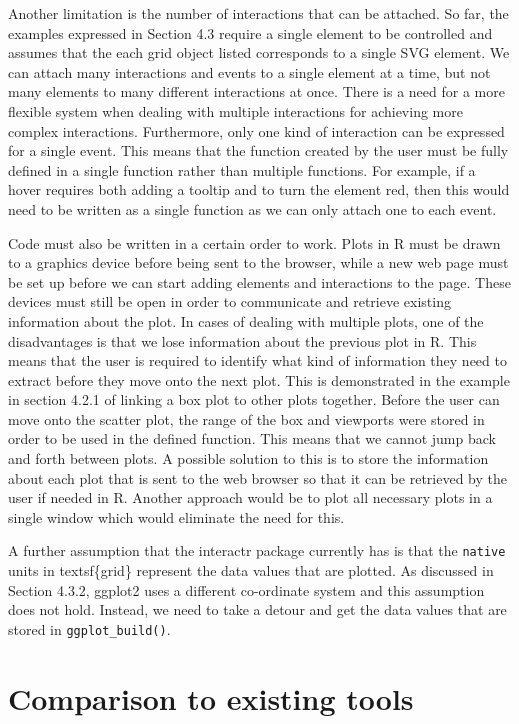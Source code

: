 \documentclass[11pt,]{report}
\begin{document}
Another limitation is the number of interactions that can be attached.
So far, the examples expressed in Section 4.3 require a single element
to be controlled and assumes that the each grid object listed
corresponds to a single SVG element. We can attach many interactions and
events to a single element at a time, but not many elements to many
different interactions at once. There is a need for a more flexible
system when dealing with multiple interactions for achieving more
complex interactions. Furthermore, only one kind of interaction can be
expressed for a single event. This means that the function created by
the user must be fully defined in a single function rather than multiple
functions. For example, if a hover requires both adding a tooltip and to
turn the element red, then this would need to be written as a single
function as we can only attach one to each event.

Code must also be written in a certain order to work. Plots in R must be
drawn to a graphics device before being sent to the browser, while a new
web page must be set up before we can start adding elements and
interactions to the page. These devices must still be open in order to
communicate and retrieve existing information about the plot. In cases
of dealing with multiple plots, one of the disadvantages is that we lose
information about the previous plot in R. This means that the user is
required to identify what kind of information they need to extract
before they move onto the next plot. This is demonstrated in the example
in section 4.2.1 of linking a box plot to other plots together. Before
the user can move onto the scatter plot, the range of the box and
viewports were stored in order to be used in the defined function. This
means that we cannot jump back and forth between plots. A possible
solution to this is to store the information about each plot that is
sent to the web browser so that it can be retrieved by the user if
needed in R. Another approach would be to plot all necessary plots in a
single window which would eliminate the need for this.

A further assumption that the \textsf{interactr} package currently has
is that the \texttt{native} units in textsf\{grid\} represent the data
values that are plotted. As discussed in Section 4.3.2, \textsf{ggplot2}
uses a different co-ordinate system and this assumption does not hold.
Instead, we need to take a detour and get the data values that are
stored in \texttt{ggplot\_build()}.

\hypertarget{comparison-to-existing-tools}{\section{Comparison to
existing tools}\label{comparison-to-existing-tools}}
\end{document}
